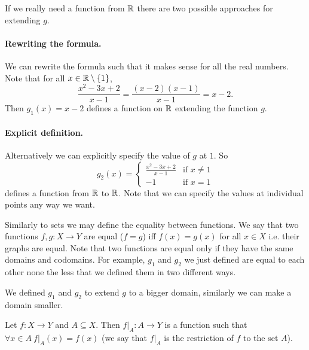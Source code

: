 If we really need a function from $\mathbb{R}$ there are two possible approaches for
extending $g$.

\paragraph{Rewriting the formula.}
We can rewrite the formula such that it makes sense for all the real numbers.
Note that for all $x \in \R \setminus \set{1}$,
\[
  \frac{x^2 - 3x + 2}{x - 1} = \frac{(x - 2)(x - 1)}{x - 1} = x - 2.
\]
Then $g_1(x) = x - 2$ defines a function on $\mathbb{R}$ extending the function $g$.

\paragraph{Explicit definition.} Alternatively we can explicitly specify the
value of $g$ at $1$. So
\[
  g_2(x) =
  \begin{cases}
    \frac{x^2 - 3x + 2}{x - 1} & \text{if } x \neq 1 \\
    -1 & \text{if } x = 1
  \end{cases}
\]
defines a function from $\mathbb{R}$ to $\mathbb{R}$. Note that we can specify the values at
individual points any way we want.

Similarly to sets we may define the equality between functions. We say that two
functions $f, g : X \to Y$ are equal ($f = g$) iff $f(x) = g(x)$ for all
$x \in X$ i.e. their graphs are equal. Note that two functions are equal only
if they have the same domains and codomains. For example, $g_1$ and $g_2$ we
just defined are equal to each other none the less that we defined them in two
different ways.

We defined $g_1$ and $g_2$ to extend $g$ to a bigger domain, similarly we can
make a domain smaller.
\begin{definition}
  Let $f : X \to Y$ and $A \subseteq X$. Then $f|_{A} : A \to Y$ is a function
  such that $\forall x \in A\ f|_{A}(x) = f(x)$ (we say that $f|_A$ is the
  restriction of $f$ to the set $A$).
\end{definition}


